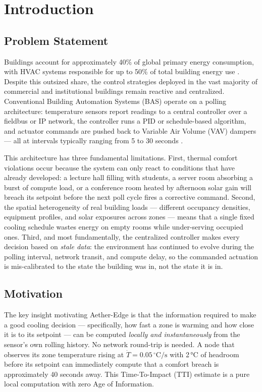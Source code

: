 \documentclass[conference]{IEEEtran}
\begin{document}
\section{Introduction}

\subsection{Problem Statement}

Buildings account for approximately 40\% of global primary energy consumption,
with HVAC systems responsible for up to 50\% of total building energy use
\cite{iea2023}.  Despite this outsized share, the control strategies deployed
in the vast majority of commercial and institutional buildings remain reactive
and centralized.  Conventional Building Automation Systems (BAS) operate on a
polling architecture: temperature sensors report readings to a central
controller over a fieldbus or IP network, the controller runs a PID or
schedule-based algorithm, and actuator commands are pushed back to Variable
Air Volume (VAV) dampers --- all at intervals typically ranging from 5 to 30
seconds \cite{ashrae2017}.

This architecture has three fundamental limitations.  First, thermal comfort
violations occur because the system can only react to conditions that have
already developed: a lecture hall filling with students, a server room
absorbing a burst of compute load, or a conference room heated by afternoon
solar gain will breach its setpoint before the next poll cycle fires a
corrective command.  Second, the spatial heterogeneity of real building loads
--- different occupancy densities, equipment profiles, and solar exposures
across zones --- means that a single fixed cooling schedule wastes energy on
empty rooms while under-serving occupied ones.  Third, and most fundamentally,
the centralized controller makes every decision based on \emph{stale data}:
the environment has continued to evolve during the polling interval, network
transit, and compute delay, so the commanded actuation is mis-calibrated to
the state the building was in, not the state it is in.

\subsection{Motivation}

The key insight motivating Aether-Edge is that the information required to
make a good cooling decision --- specifically, how fast a zone is warming and
how close it is to its setpoint --- can be computed \emph{locally and
instantaneously} from the sensor's own rolling history.  No network round-trip
is needed.  A node that observes its zone temperature rising at
$\dot{T} = 0.05\,^\circ\text{C/s}$ with 2\,°C of headroom before its setpoint
can immediately compute that a comfort breach is approximately 40 seconds away.
This Time-To-Impact (TTI) estimate is a pure local computation with zero Age
of Information.
\end{document}
